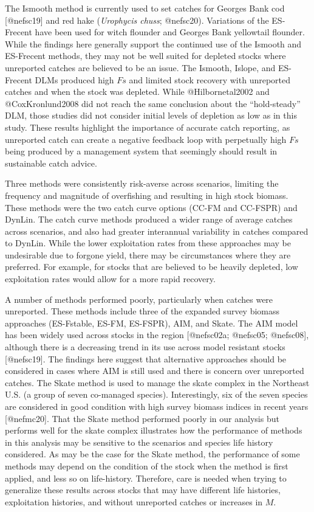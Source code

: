 \documentclass[
  12pt,
]{article}
\begin{document}
The Ismooth method is currently used to set catches for Georges Bank cod {[}@nefsc19{]} and red hake (\emph{Urophycis chuss}; @nefsc20). Variations of the ES-Frecent have been used for witch flounder and Georges Bank yellowtail flounder. While the findings here generally support the continued use of the Ismooth and ES-Frecent methods, they may not be well suited for depleted stocks where unreported catches are believed to be an issue. The Ismooth, Islope, and ES-Frecent DLMs produced high \(Fs\) and limited stock recovery with unreported catches and when the stock was depleted. While @Hilbornetal2002 and @CoxKronlund2008 did not reach the same conclusion about the ``hold-steady'' DLM, those studies did not consider initial levels of depletion as low as in this study. These results highlight the importance of accurate catch reporting, as unreported catch can create a negative feedback loop with perpetually high \(Fs\) being produced by a management system that seemingly should result in sustainable catch advice.

Three methods were consistently risk-averse across scenarios, limiting the frequency and magnitude of overfishing and resulting in high stock biomass. These methods were the two catch curve options (CC-FM and CC-FSPR) and DynLin. The catch curve methods produced a wider range of average catches across scenarios, and also had greater interannual variability in catches compared to DynLin. While the lower exploitation rates from these approaches may be undesirable due to forgone yield, there may be circumstances where they are preferred. For example, for stocks that are believed to be heavily depleted, low exploitation rates would allow for a more rapid recovery.

A number of methods performed poorly, particularly when catches were unreported. These methods include three of the expanded survey biomass approaches (ES-Fstable, ES-FM, ES-FSPR), AIM, and Skate. The AIM model has been widely used across stocks in the region {[}@nefsc02a; @nefsc05; @nefsc08{]}, although there is a decreasing trend in its use across model resistant stocks {[}@nefsc19{]}. The findings here suggest that alternative approaches should be considered in cases where AIM is still used and there is concern over unreported catches. The Skate method is used to manage the skate complex in the Northeast U.S. (a group of seven co-managed species). Interestingly, six of the seven species are considered in good condition with high survey biomass indices in recent years {[}@nefmc20{]}. That the Skate method performed poorly in our analysis but performs well for the skate complex illustrates how the performance of methods in this analysis may be sensitive to the scenarios and species life history considered. As may be the case for the Skate method, the performance of some methods may depend on the condition of the stock when the method is first applied, and less so on life-history. Therefore, care is needed when trying to generalize these results across stocks that may have different life histories, exploitation histories, and without unreported catches or increases in \(M\).
\end{document}
